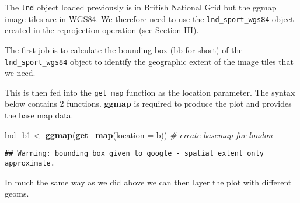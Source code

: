 \documentclass[]{article}
\newenvironment{Shaded}{}{}
\newcommand{\KeywordTok}[1]{\textcolor[rgb]{0.00,0.44,0.13}{\textbf{{#1}}}}
\newcommand{\DataTypeTok}[1]{\textcolor[rgb]{0.56,0.13,0.00}{{#1}}}
\newcommand{\DecValTok}[1]{\textcolor[rgb]{0.25,0.63,0.44}{{#1}}}
\newcommand{\FloatTok}[1]{\textcolor[rgb]{0.25,0.63,0.44}{{#1}}}
\newcommand{\StringTok}[1]{\textcolor[rgb]{0.25,0.44,0.63}{{#1}}}
\newcommand{\CommentTok}[1]{\textcolor[rgb]{0.38,0.63,0.69}{\textit{{#1}}}}
\newcommand{\NormalTok}[1]{{#1}}
\begin{document}
The \texttt{lnd} object loaded previously is in British National Grid
but the ggmap image tiles are in WGS84. We therefore need to use the
\texttt{lnd\_sport\_wgs84} object created in the reprojection operation
(see Section III).

The first job is to calculate the bounding box (bb for short) of the
\texttt{lnd\_sport\_wgs84} object to identify the geographic extent of
the image tiles that we need.

\begin{Shaded}
\end{Shaded}

This is then fed into the \texttt{get\_map} function as the location
parameter. The syntax below contains 2 functions. \textbf{ggmap} is
required to produce the plot and provides the base map data.

\begin{Shaded}
\begin{Highlighting}[]
\NormalTok{lnd_b1 <-}\StringTok{ }\KeywordTok{ggmap}\NormalTok{(}\KeywordTok{get_map}\NormalTok{(}\DataTypeTok{location =} \NormalTok{b)) }\CommentTok{# create basemap for london}
\end{Highlighting}
\end{Shaded}

\begin{verbatim}
## Warning: bounding box given to google - spatial extent only approximate.
\end{verbatim}

In much the same way as we did above we can then layer the plot with
different geoms.
\end{document}

